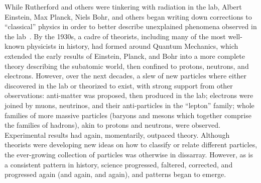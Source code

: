 \begin{dissertationintroduction}
While Rutherford and others were tinkering with radiation in the lab, Albert Einstein, Max Planck, Niels Bohr, and others began writing down corrections to ``classical'' physics in order to better describe unexplained phenomena observed in the lab~\cite{EinsteinPhotoelectric, Planck, Bohr}. 
By the 1930s, a cadre of theorists, including many of the most well-known physicists in history\footnotemark{}, had formed around Quantum Mechanics, which extended the early results of Einstein, Planck, and Bohr into a more complete theory describing the subatomic world, then confined to protons, neutrons, and electrons. 
However, over the next decades, a slew of new particles where either discovered in the lab or theorized to exist, with strong support from other observations: 
anti-matter was proposed, then produced in the lab; %
electrons were joined by muons, neutrinos, and their anti-particles in the ``lepton'' family; %
whole families of more massive particles (baryons and mesons which together comprise the families of hadrons), akin to protons and neutrons, were observed. %
Experimental results had again, momentarily, outpaced theory. 
Although theorists were developing new ideas on how to classify or relate different particles, the ever-growing collection of particles was otherwise in dissarray. 
However, as is a consistent pattern in history, science progressed, faltered, corrected, and progressed again (and again, and again), and patterns began to emerge. 


\end{dissertationintroduction}
